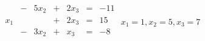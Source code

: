 {$\begin{array}{ccccccc}
&-&5x_2&+&2x_3&=&-11\\
x_1&&&+&2x_3&=&15\\
&-&3x_2&+&x_3&=&-8\\
\end{array}$}
{$x_1=1,x_2=5,x_3=7$}